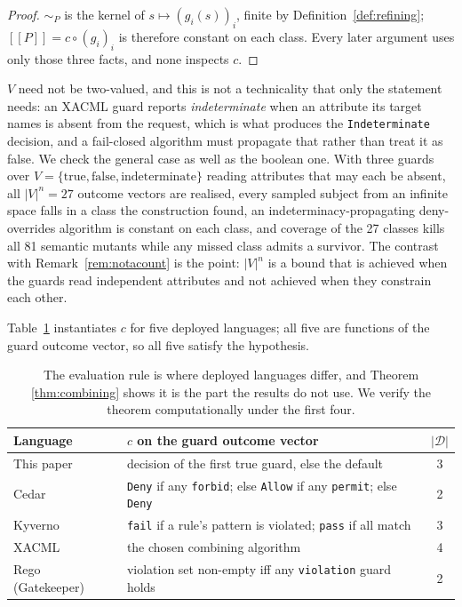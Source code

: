 \documentclass[11pt,a4paper]{article}
\theoremstyle{plain}
\theoremstyle{definition}
\theoremstyle{remark}
\newcommand{\sem}[1]{[\![#1]\!]}
\newcommand{\Dom}{\mathcal{D}}
\begin{document}
\begin{proof}
$\sim_P$ is the kernel of $s \mapsto (g_i(s))_i$, finite by Definition~\ref{def:refining};
$\sem{P} = c \circ (g_i)_i$ is therefore constant on each class. Every later argument uses
only those three facts, and none inspects $c$.
\end{proof}

$V$ need not be two-valued, and this is not a technicality that only the statement needs:
an XACML guard reports \emph{indeterminate} when an attribute its target names is absent
from the request, which is what produces the \texttt{Indeterminate} decision, and a
fail-closed algorithm must propagate that rather than treat it as false. We check the
general case as well as the boolean one. With three guards over $V = \{\text{true},
\text{false}, \text{indeterminate}\}$ reading attributes that may each be absent, all
$|V|^n = 27$ outcome vectors are realised, every sampled subject from an infinite space
falls in a class the construction found, an indeterminacy-propagating deny-overrides
algorithm is constant on each class, and coverage of the 27 classes kills all 81 semantic
mutants while any missed class admits a survivor. The contrast with
Remark~\ref{rem:notacount} is the point: $|V|^n$ is a bound that is achieved when the
guards read independent attributes and not achieved when they constrain each other.

Table~\ref{tab:combining} instantiates $c$ for five deployed languages; all five are
functions of the guard outcome vector, so all five satisfy the hypothesis.

\begin{table}[t]
\centering
\begin{tabular}{llc}
\toprule
Language & $c$ on the guard outcome vector & $|\Dom|$ \\
\midrule
This paper & decision of the first true guard, else the default & 3 \\
Cedar \cite{cedar2024} & \texttt{Deny} if any \texttt{forbid}; else \texttt{Allow} if any \texttt{permit}; else \texttt{Deny} & 2 \\
Kyverno \cite{kyverno} & \texttt{fail} if a rule's pattern is violated; \texttt{pass} if all match & 3 \\
XACML \cite{xacml30} & the chosen combining algorithm & 4 \\
Rego (Gatekeeper) \cite{gatekeeper} & violation set non-empty iff any \texttt{violation} guard holds & 2 \\
\bottomrule
\end{tabular}
\caption{The evaluation rule is where deployed languages differ, and Theorem
\ref{thm:combining} shows it is the part the results do not use. We verify the theorem
computationally under the first four.}
\label{tab:combining}
\end{table}
\end{document}
